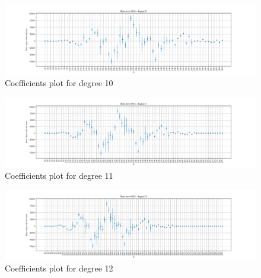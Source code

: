 \documentclass[11pt, a4paper]{article}
\begin{document}
\begin{figure}
  \centering
  \hspace*{-4.2cm}
  \includegraphics[scale=0.52]{figures/EX6_EX1_OLS_beta_error_degree10.pdf}
  \caption{Coefficients plot for degree 10}
  \label{fig:EX6_1_OLS_betas_plot_degree10}
\end{figure}

\begin{figure}
  \centering
  \hspace*{-4.2cm}
  \includegraphics[scale=0.52]{figures/EX6_EX1_OLS_beta_error_degree11.pdf}
  \caption{Coefficients plot for degree 11}
  \label{fig:EX6_1_OLS_betas_plot_degree11}
\end{figure}

\begin{figure}
  \centering
  \hspace*{-4.2cm}
  \includegraphics[scale=0.52]{figures/EX6_EX1_OLS_beta_error_degree12.pdf}
  \caption{Coefficients plot for degree 12}
  \label{fig:EX6_1_OLS_betas_plot_degree12}
\end{figure}
\end{document}
